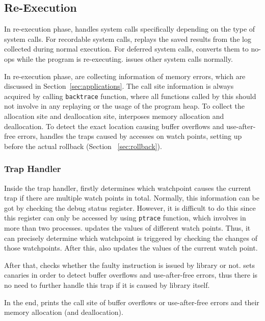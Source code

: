 \subsection{Re-Execution}
In re-execution phase, \doubletake{} handles system calls specifically depending on the type of system calls. For recordable system calls, \doubletake{} replays the saved results from the log collected during normal execution.
For deferred system calls, \doubletake{} converts them to no-ops while the program is re-executing. \doubletake{}  issues other system calls normally.

In re-execution phase, \doubletake{} are collecting information of memory errors, which are discussed in Section~\ref{sec:applications}. The call site information is always acquired by calling \texttt{backtrace} function, where all functions called by this should not involve in any replaying or the usage of the program heap. To collect the allocation site and deallocation site, \doubletake{} interposes memory allocation and deallocation. To detect the exact location causing buffer overflows and use-after-free errors, \doubletake{} handles the traps caused by accesses on watch points, setting up before the actual rollback (Section ~\ref{sec:rollback}). 

\subsubsection{Trap Handler}
Inside the trap handler, \doubletake{} firstly determines which watchpoint causes the current trap if there are multiple watch points in total. Normally, this information can be got by checking the debug status register. However, it is difficult to do this since this register can only be accessed by using \texttt{ptrace} function, which involves in more than two processes. \doubletake{} updates the values of different watch points. Thus, it can precisely determine which watchpoint is triggered by checking the changes of those watchpoints. After this, \doubletake{} also updates the values of the current watch point. 

After that, \doubletake{} checks whether the faulty instruction is issued by \doubletake{} library or not. \doubletake{} sets canaries in order to detect buffer overflows and use-after-free errors, thus there is no need to further handle this trap if it is caused by \doubletake{} library itself. 

In the end, \doubletake{}  prints the call site of buffer overflows or use-after-free errors and their memory allocation (and deallocation).  

